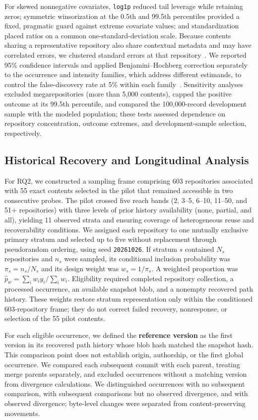 \documentclass[conference]{IEEEtran}
\begin{document}
For skewed nonnegative covariates, \texttt{log1p} reduced tail leverage while retaining zeros; symmetric winsorization at the 0.5th and 99.5th percentiles provided a fixed, pragmatic guard against extreme covariate values; and standardization placed ratios on a common one-standard-deviation scale. Because contents sharing a representative repository also share contextual metadata and may have correlated errors, we clustered standard errors at that repository~\cite{cameron2015}. We reported 95\% confidence intervals and applied Benjamini--Hochberg correction separately to the occurrence and intensity families, which address different estimands, to control the false-discovery rate at 5\% within each family~\cite{benjamini1995}. Sensitivity analyses excluded megarepositories (more than 5,000 contents), capped the positive outcome at its 99.5th percentile, and compared the 100,000-record development sample with the modeled population; these tests assessed dependence on repository concentration, outcome extremes, and development-sample selection, respectively.

\subsection{Historical Recovery and Longitudinal Analysis}

For RQ2, we constructed a sampling frame comprising 603 repositories associated with 55 exact contents selected in the pilot that remained accessible in two consecutive probes. The pilot crossed five reach bands (2, 3--5, 6--10, 11--50, and 51+ repositories) with three levels of prior history availability (none, partial, and all), yielding 11 observed strata and ensuring coverage of heterogeneous reuse and recoverability conditions. We assigned each repository to one mutually exclusive primary stratum and selected up to five without replacement through pseudorandom ordering, using seed \texttt{20261026}. If stratum $s$ contained $N_s$ repositories and $n_s$ were sampled, its conditional inclusion probability was $\pi_s=n_s/N_s$ and its design weight was $w_s=1/\pi_s$. A weighted proportion was $\hat p_w=\sum_iw_i y_i/\sum_iw_i$. Eligibility required completed repository collection, a processed occurrence, an available snapshot blob, and a nonempty recovered path history. These weights restore stratum representation only within the conditioned 603-repository frame; they do not correct failed recovery, nonresponse, or selection of the 55 pilot contents.

For each eligible occurrence, we defined the \textbf{reference version} as the first version in its recovered path history whose blob hash matched the snapshot hash. This comparison point does not establish origin, authorship, or the first global occurrence. We compared each subsequent commit with each parent, treating merge parents separately, and excluded occurrences without a matching version from divergence calculations. We distinguished occurrences with no subsequent comparison, with subsequent comparisons but no observed divergence, and with observed divergence; byte-level changes were separated from content-preserving movements.
\end{document}
